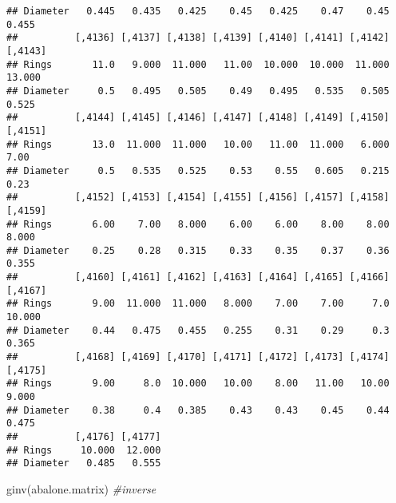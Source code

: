 \documentclass[
]{article}
\newenvironment{Shaded}{\begin{snugshade}}{\end{snugshade}}
\newcommand{\CommentTok}[1]{\textcolor[rgb]{0.56,0.35,0.01}{\textit{#1}}}
\newcommand{\FunctionTok}[1]{\textcolor[rgb]{0.00,0.00,0.00}{#1}}
\newcommand{\NormalTok}[1]{#1}
\begin{document}
\begin{verbatim}
## Diameter   0.445   0.435   0.425    0.45   0.425    0.47    0.45   0.455
##          [,4136] [,4137] [,4138] [,4139] [,4140] [,4141] [,4142] [,4143]
## Rings       11.0   9.000  11.000   11.00  10.000  10.000  11.000  13.000
## Diameter     0.5   0.495   0.505    0.49   0.495   0.535   0.505   0.525
##          [,4144] [,4145] [,4146] [,4147] [,4148] [,4149] [,4150] [,4151]
## Rings       13.0  11.000  11.000   10.00   11.00  11.000   6.000    7.00
## Diameter     0.5   0.535   0.525    0.53    0.55   0.605   0.215    0.23
##          [,4152] [,4153] [,4154] [,4155] [,4156] [,4157] [,4158] [,4159]
## Rings       6.00    7.00   8.000    6.00    6.00    8.00    8.00   8.000
## Diameter    0.25    0.28   0.315    0.33    0.35    0.37    0.36   0.355
##          [,4160] [,4161] [,4162] [,4163] [,4164] [,4165] [,4166] [,4167]
## Rings       9.00  11.000  11.000   8.000    7.00    7.00     7.0  10.000
## Diameter    0.44   0.475   0.455   0.255    0.31    0.29     0.3   0.365
##          [,4168] [,4169] [,4170] [,4171] [,4172] [,4173] [,4174] [,4175]
## Rings       9.00     8.0  10.000   10.00    8.00   11.00   10.00   9.000
## Diameter    0.38     0.4   0.385    0.43    0.43    0.45    0.44   0.475
##          [,4176] [,4177]
## Rings     10.000  12.000
## Diameter   0.485   0.555
\end{verbatim}

\begin{Shaded}
\begin{Highlighting}[]
\FunctionTok{ginv}\NormalTok{(abalone.matrix) }\CommentTok{\#inverse}
\end{Highlighting}
\end{Shaded}
\end{document}
